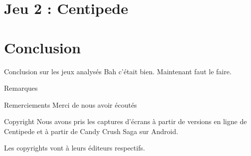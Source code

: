 \documentclass{beamer}
\begin{document}
\section{Jeu 2 : Centipede}


\section{Conclusion}
\begin{frame}{Conclusion sur les jeux analysés}
	Bah c'était bien. Maintenant faut le faire.
\end{frame}
\begin{frame}{Remarques}
	\begin{block}{Remerciements}
		Merci de nous avoir écoutés
	\end{block}
	\begin{block}{Copyright}
		Nous avons pris les captures d'écrans à partir de versions en ligne de Centipede et à partir de Candy Crush Saga sur Android.

Les copyrights vont à leurs éditeurs respectifs.
	\end{block}
\end{frame}
\end{document}
